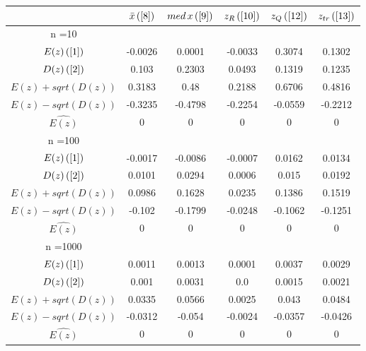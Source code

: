 \begin{tabular}{|c|c|c|c|c|c|}
\hline
 & $\bar{x} \, (\ref{8})$ & $med \, x \, (\ref{9})$ & $z_R \, (\ref{10})$ & $z_Q \, (\ref{12})$ & $z_{tr} \, (\ref{13})$ \\
\hline
n =10 &  &  &  &  & \\
\hline
$E(z) \, (\ref{1})$ & -0.0026 & 0.0001 & -0.0033 & 0.3074 & 0.1302\\
\hline
$D(z) \, (\ref{2})$ & 0.103 & 0.2303 & 0.0493 & 0.1319 & 0.1235\\
\hline
$E(z)+sqrt(D(z))$ & 0.3183 & 0.48 & 0.2188 & 0.6706 & 0.4816\\
\hline
$E(z)-sqrt(D(z))$ & -0.3235 & -0.4798 & -0.2254 & -0.0559 & -0.2212\\
\hline
$\hat{E(z)}$ & 0 & 0 & 0 & 0 & 0\\
\hline
n =100 &  &  &  &  & \\
\hline
$E(z) \, (\ref{1})$ & -0.0017 & -0.0086 & -0.0007 & 0.0162 & 0.0134\\
\hline
$D(z) \, (\ref{2})$ & 0.0101 & 0.0294 & 0.0006 & 0.015 & 0.0192\\
\hline
$E(z)+sqrt(D(z))$ & 0.0986 & 0.1628 & 0.0235 & 0.1386 & 0.1519\\
\hline
$E(z)-sqrt(D(z))$ & -0.102 & -0.1799 & -0.0248 & -0.1062 & -0.1251\\
\hline
$\hat{E(z)}$ & 0 & 0 & 0 & 0 & 0\\
\hline
n =1000 &  &  &  &  & \\
\hline
$E(z) \, (\ref{1})$ & 0.0011 & 0.0013 & 0.0001 & 0.0037 & 0.0029\\
\hline
$D(z) \, (\ref{2})$ & 0.001 & 0.0031 & 0.0 & 0.0015 & 0.0021\\
\hline
$E(z)+sqrt(D(z))$ & 0.0335 & 0.0566 & 0.0025 & 0.043 & 0.0484\\
\hline
$E(z)-sqrt(D(z))$ & -0.0312 & -0.054 & -0.0024 & -0.0357 & -0.0426\\
\hline
$\hat{E(z)}$ & 0 & 0 & 0 & 0 & 0\\
\hline
\end{tabular}